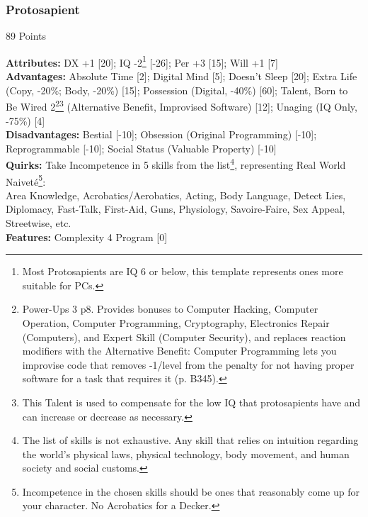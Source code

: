 \begin{multicols*}{3}
	\subsubsection*{Protosapient}
	\begin{flushright}
		89 Points
	\end{flushright}
	\textbf{Attributes:} 
	DX +1 [20]; IQ -2\footnote{Most Protosapients are IQ 6 or below, this template represents ones more suitable for PCs.} [-26]; Per +3 [15]; Will +1 [7]
	\\\textbf{Advantages:} 
	Absolute Time [2]; Digital Mind [5]; Doesn't Sleep [20]; Extra Life (Copy, -20\%; Body, -20\%) [15]; Possession (Digital, -40\%) [60]; Talent, Born to Be Wired 2\footnote{Power-Ups 3 p8. Provides bonuses to Computer Hacking, Computer Operation, Computer Programming, Cryptography, Electronics Repair (Computers), and Expert Skill (Computer Security), and replaces reaction modifiers with the Alternative Benefit: Computer Programming lets you improvise code that removes -1/level from the penalty for not having proper software for a task that requires it (p. B345).}\footnote{This Talent is used to compensate for the low IQ that protosapients have and can increase or decrease as necessary.} (Alternative Benefit, Improvised Software) [12]; Unaging (IQ Only, -75\%) [4]
	\\\textbf{Disadvantages:} 
	Bestial [-10]; Obsession (Original Programming) [-10]; Reprogrammable [-10]; Social Status (Valuable Property) [-10]
	\\\textbf{Quirks:}
	Take Incompetence in 5 skills from the list\footnote{The list of skills is not exhaustive. Any skill that relies on intuition regarding the world's physical laws, physical technology, body movement, and human society and social customs.}, representing Real World Naiveté\footnote{Incompetence in the chosen skills should be ones that reasonably come up for your character. No Acrobatics for a Decker.}:\\
	Area Knowledge, Acrobatics/Aerobatics, Acting, Body Language, Detect Lies, Diplomacy, Fast-Talk, First-Aid, Guns, Physiology,  Savoire-Faire, Sex Appeal, Streetwise, etc.
	\\\textbf{Features:}
	Complexity 4 Program [0]
	

\end{multicols*}
